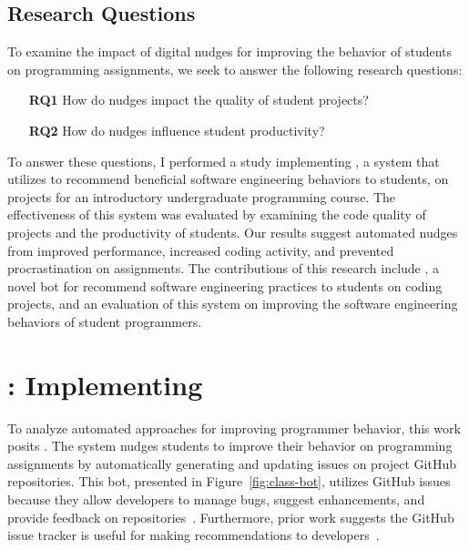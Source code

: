 \subsection{Research Questions}

To examine the impact of digital nudges for improving the behavior of students on programming assignments, we seek to answer the following research questions:

\begin{itemize}[topsep=0pt,itemsep=-1ex,partopsep=1ex,parsep=1ex]
  \item[\textbf{RQ1}] How do nudges impact the quality of student projects?
  \item[\textbf{RQ2}] How do nudges influence student productivity?
\end{itemize}

To answer these questions, I performed a study implementing \tooltwo, a system that utilizes \framework to recommend beneficial software engineering behaviors to students, on projects for an introductory undergraduate programming course. The effectiveness of this system was evaluated by examining the code quality of projects and the productivity of students. Our results suggest automated nudges from \framework improved performance, increased coding activity, and prevented procrastination on assignments. The contributions of this research include \tooltwo, a novel bot for recommend software engineering practices to students on coding projects, and an evaluation of \framework this system on improving the software engineering behaviors of student programmers.

\section{\tooltwo: Implementing \FrameWork}

To analyze automated approaches for improving programmer behavior, this work posits \tooltwo. The \tooltwo system nudges students to improve their behavior on programming assignments by automatically generating and updating issues on project GitHub repositories. This bot, presented in Figure~\ref{fig:class-bot}, utilizes GitHub issues because they allow developers to manage bugs, suggest enhancements, and provide feedback on repositories~\cite{Issues}. Furthermore, prior work suggests the GitHub issue tracker is useful for making recommendations to developers~\cite{bissyande2013issues}. 

